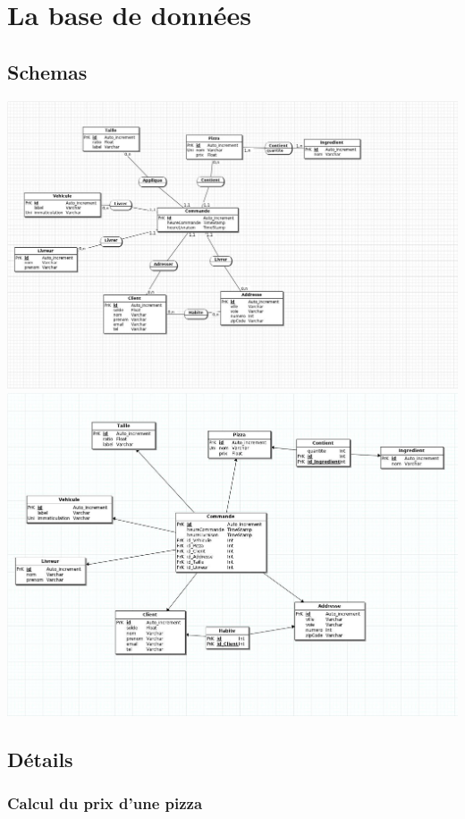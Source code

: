 \documentclass[]{article}
\begin{document}
\section{La base de données}\label{la-base-de-donnuxe9es}

\subsection{Schemas}\label{schemas}

\includegraphics{../img/mcd.jpg} \includegraphics{../img/mld.jpg}

\subsection{Détails}\label{duxe9tails}

\subsubsection{Calcul du prix d'une
    pizza}\label{calcul-du-prix-dune-pizza}
\end{document}
